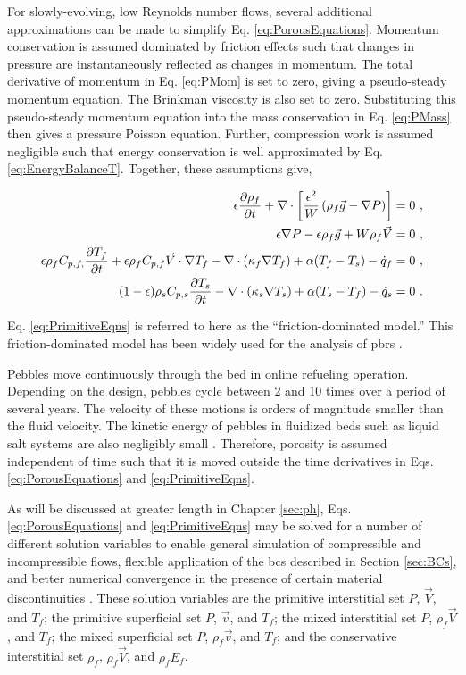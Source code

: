 For slowly-evolving, low Reynolds number flows, several additional approximations can be made to simplify Eq. \eqref{eq:PorousEquations}. Momentum conservation is assumed dominated by friction effects such that changes in pressure are instantaneously reflected as changes in momentum. The total derivative of momentum in Eq. \eqref{eq:PMom} is set to zero, giving a pseudo-steady momentum equation. The Brinkman viscosity is also set to zero. Substituting this pseudo-steady momentum equation into the mass conservation in Eq. \eqref{eq:PMass} then gives a pressure Poisson equation. Further, compression work is assumed negligible such that energy conservation is well approximated by Eq. \eqref{eq:EnergyBalanceT}. Together, these assumptions give,

\begin{subequations}
\label{eq:PrimitiveEqns}
\begin{align}
\label{eq:PMass2}
\epsilon\frac{\partial\rho_f}{\partial t}+\nabla\cdot\left\lbrack\frac{\epsilon^2}{W}\left(\rho_f\vec{g}-\nabla P\right)\right\rbrack=0\ ,\\
\label{eq:PMom2}
\epsilon\nabla P-\epsilon\rho_f\vec{g}+W\rho_f\vec{V}=0\ ,\\
\label{eq:PEnergy2}
\epsilon\rho_fC_{p,f,}\frac{\partial T_f}{\partial t}+\epsilon\rho_fC_{p,f}\vec{V}\cdot\nabla T_f-\nabla\cdot(\kappa_f\nabla T_f)+\alpha(T_f-T_s)-\dot{q}_f=0\ ,\\
\label{eq:PSEnergy2}
(1-\epsilon)\rho_sC_{p,s}\frac{\partial T_s}{\partial t}-\nabla\cdot(\kappa_s\nabla T_s)+\alpha(T_s-T_f)-\dot{q}_s=0\ .
\end{align}
\end{subequations}

\noindent Eq. \eqref{eq:PrimitiveEqns} is referred to here as the ``friction-dominated model.'' This friction-dominated model has been widely used for the analysis of \glspl{pbr} \cite{hossain, nouri, tecdoc1163}.  

Pebbles move continuously through the bed in online refueling operation. Depending on the design, pebbles cycle between 2 and 10 times over a period of several years. The velocity of these motions is orders of magnitude smaller than the fluid velocity. The kinetic energy of pebbles in fluidized beds such as liquid salt systems are also negligibly small \cite{mardus_hall}. Therefore, porosity is assumed independent of time such that it is moved outside the time derivatives in Eqs. \eqref{eq:PorousEquations} and \eqref{eq:PrimitiveEqns}.

As will be discussed at greater length in Chapter \ref{sec:ph}, Eqs. \eqref{eq:PorousEquations} and \eqref{eq:PrimitiveEqns} may be solved for a number of different solution variables to enable general simulation of compressible and incompressible flows, flexible application of the \glspl{bc} described in Section \ref{sec:BCs}, and better numerical convergence in the presence of certain material discontinuities \cite{hauke_1998}. These solution variables are the primitive interstitial set \(P\), \(\vec{V}\), and \(T_f\); the primitive superficial set \(P\), \(\vec{v}\), and \(T_f\); the mixed interstitial set \(P\), \(\rho_f\vec{V}\), and \(T_f\); the mixed superficial set \(P\), \(\rho_f\vec{v}\), and \(T_f\); and the conservative interstitial set \(\rho_f\), \(\rho_f\vec{V}\), and \(\rho_fE_f\).

